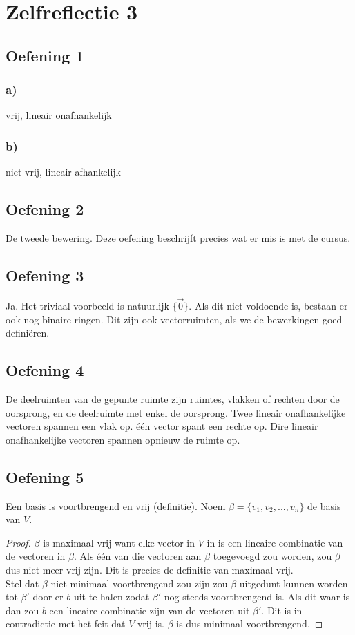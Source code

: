 \documentclass[lineaire_algebra_oplossingen.tex]{subfiles}
\begin{document}
\section{Zelfreflectie 3}
\subsection{Oefening 1}
\subsubsection*{a)}
vrij, lineair onafhankelijk
\subsubsection*{b)}
niet vrij, lineair afhankelijk

\subsection{Oefening 2}
De tweede bewering. Deze oefening beschrijft precies wat er mis is met de cursus.

\subsection{Oefening 3}
Ja. Het triviaal voorbeeld is natuurlijk $\{\vec{0}\}$. Als dit niet voldoende is, bestaan er ook nog binaire ringen. Dit zijn ook vectorruimten, als we de bewerkingen goed defini\"eren.

\subsection{Oefening 4}
De deelruimten van de gepunte ruimte zijn ruimtes, vlakken of rechten door de oorsprong, en de deelruimte met enkel de oorsprong. Twee lineair onafhankelijke vectoren spannen een vlak op. \'e\'en vector spant een rechte op. Dire lineair onafhankelijke vectoren spannen opnieuw de ruimte op. 

\subsection{Oefening 5}
Een basis is voortbrengend en vrij (definitie). Noem $\beta = \{v_1,v_2,...,v_n\}$ de basis van $V$.
\begin{proof}
$\beta$ is maximaal vrij want elke vector in $V$ in is een lineaire combinatie van de vectoren in $\beta$. Als \'e\'en van die vectoren aan $\beta$ toegevoegd zou worden, zou $\beta$ dus niet meer vrij zijn. Dit is precies de definitie van maximaal vrij.\\
Stel dat $\beta$ niet minimaal voortbrengend zou zijn zou $\beta$ uitgedunt kunnen worden tot $\beta'$ door er $b$ uit te halen zodat $\beta'$ nog steeds voortbrengend is. Als dit waar is dan zou $b$ een lineaire combinatie zijn van de vectoren uit $\beta'$. Dit is in contradictie met het feit dat $V$ vrij is. $\beta$ is dus minimaal voortbrengend.
\end{proof}
\end{document}
